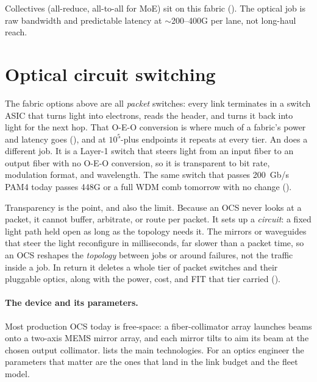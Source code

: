 Collectives (all-reduce, all-to-all for MoE) sit on this fabric
(). The optical job is raw bandwidth and predictable
latency at $\sim$200--400G per lane, not long-haul reach.

\section{Optical circuit switching}
\label{sec:ocs}

The fabric options above are all \emph{packet} switches: every link terminates in a
switch ASIC that turns light into electrons, reads the header, and turns it back into
light for the next hop. That O-E-O conversion is where much of a fabric's power and
latency goes (), and at $10^5$-plus endpoints it repeats at every tier.
An  does a different job. It is a Layer-1
switch that steers light from an input fiber to an output fiber with no O-E-O
conversion, so it is transparent to bit rate, modulation format, and wavelength. The
same switch that passes 200~Gb/s PAM4 today passes 448G or a full WDM comb tomorrow with
no change ().

Transparency is the point, and also the limit. Because an OCS never looks at a packet, it
cannot buffer, arbitrate, or route per packet. It sets up a \emph{circuit}: a fixed light
path held open as long as the topology needs it. The mirrors or waveguides that steer the
light reconfigure in milliseconds, far slower than a packet time, so an OCS reshapes the
\emph{topology} between jobs or around failures, not the traffic inside a job. In return
it deletes a whole tier of packet switches and their pluggable optics, along with the
power, cost, and FIT that tier carried ().

\paragraph{The device and its parameters.}
Most production OCS today is free-space: a fiber-collimator array launches beams onto a
two-axis MEMS mirror array, and each mirror tilts to aim its beam at the chosen output
collimator.  lists the main technologies. For an optics engineer the
parameters that matter are the ones that land in the link budget and the fleet model.

